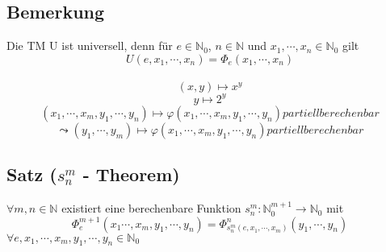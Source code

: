 \documentclass[a4paper,11pt]{article}
\begin{document}
\subsection{Bemerkung} Die TM U ist universell, denn für $e \in \mathbb{N}_0$, $n \in \mathbb{N}$ und $x_1, \cdots, x_n \in \mathbb{N}_0$ gilt \[U(e,x_1, \cdots, x_n) = \Phi_e(x_1, \cdots, x_n)\]\\ \[(x, y) \mapsto x^y\] \[y \mapsto 2^y\] \[(x_1, \cdots, x_m, y_1, \cdots, y_n) \mapsto \varphi(x_1, \cdots, x_m, y_1, \cdots, y_n) partiell berechenbar\] \[\leadsto (y_1,\cdots, y_m) \mapsto \varphi(x_1, \cdots, x_m, y_1, \cdots, y_n) partiell berechenbar \]

\subsection{Satz ($s_n^m$ - Theorem)} $\forall m, n \in \mathbb{N}$ existiert eine berechenbare Funktion $s_n^m : \mathbb{N}_0^{m+1} \to \mathbb{N}_0$ mit \[\Phi_e^{m+1}(x_1\cdots, x_m, y_1, \cdots, y_n) = \Phi_{s_n^m(e, x_1, \cdots, x_m)}^n (y_1, \cdots, y_n)\] $\forall e, x_1, \cdots, x_m, y_1, \cdots, y_n \in \mathbb{N}_0$
\end{document}
